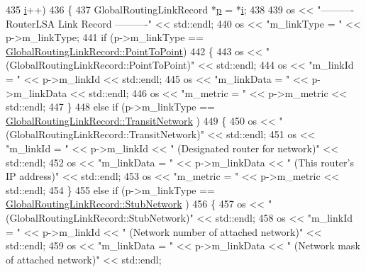 \begin{DoxyCode}
435             \hyperlink{bernuolliDistribution_8m_a6f6ccfcf58b31cb6412107d9d5281426}{i}++)
436         \{
437           GlobalRoutingLinkRecord *\hyperlink{lte__link__budget_8m_ac9de518908a968428863f829398a4e62}{p} = *\hyperlink{bernuolliDistribution_8m_a6f6ccfcf58b31cb6412107d9d5281426}{i};
438 
439           os << \textcolor{stringliteral}{"---------- RouterLSA Link Record ----------"} << std::endl;
440           os << \textcolor{stringliteral}{"m\_linkType = "} << p->m\_linkType;
441           \textcolor{keywordflow}{if} (p->m\_linkType == \hyperlink{classns3_1_1GlobalRoutingLinkRecord_a9380bcce9bca03943c4761b166a694f4aa345c79cdcaba957f5e8296509183912}{GlobalRoutingLinkRecord::PointToPoint})
442             \{
443               os << \textcolor{stringliteral}{" (GlobalRoutingLinkRecord::PointToPoint)"} << std::endl;
444               os << \textcolor{stringliteral}{"m\_linkId = "} << p->m\_linkId << std::endl;
445               os << \textcolor{stringliteral}{"m\_linkData = "} << p->m\_linkData << std::endl;
446               os << \textcolor{stringliteral}{"m\_metric = "} << p->m\_metric << std::endl;
447             \}
448           \textcolor{keywordflow}{else} \textcolor{keywordflow}{if} (p->m\_linkType == \hyperlink{classns3_1_1GlobalRoutingLinkRecord_a9380bcce9bca03943c4761b166a694f4ad3d00014c9ba50539a53b55fce117856}{GlobalRoutingLinkRecord::TransitNetwork}
      )
449             \{
450               os << \textcolor{stringliteral}{" (GlobalRoutingLinkRecord::TransitNetwork)"} << std::endl;
451               os << \textcolor{stringliteral}{"m\_linkId = "} << p->m\_linkId << \textcolor{stringliteral}{" (Designated router for network)"} << std::endl;
452               os << \textcolor{stringliteral}{"m\_linkData = "} << p->m\_linkData << \textcolor{stringliteral}{" (This router's IP address)"} << std::endl;
453               os << \textcolor{stringliteral}{"m\_metric = "} << p->m\_metric << std::endl;
454             \}
455           \textcolor{keywordflow}{else} \textcolor{keywordflow}{if} (p->m\_linkType == \hyperlink{classns3_1_1GlobalRoutingLinkRecord_a9380bcce9bca03943c4761b166a694f4a183ff8c880e05253fdca7bece2cad90b}{GlobalRoutingLinkRecord::StubNetwork}
      )
456             \{
457               os << \textcolor{stringliteral}{" (GlobalRoutingLinkRecord::StubNetwork)"} << std::endl;
458               os << \textcolor{stringliteral}{"m\_linkId = "} << p->m\_linkId << \textcolor{stringliteral}{" (Network number of attached network)"} << std::endl;
459               os << \textcolor{stringliteral}{"m\_linkData = "} << p->m\_linkData << \textcolor{stringliteral}{" (Network mask of attached network)"} << std::endl;

\end{DoxyCode}

